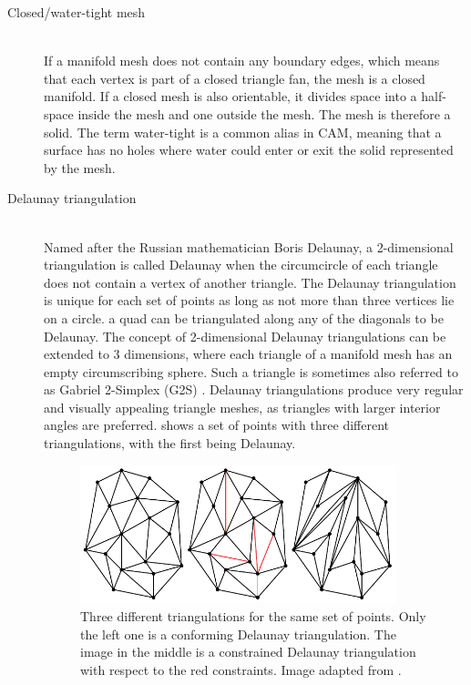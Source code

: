 \begin{description}
	\item[Closed/water-tight mesh] \hfill \\
	If a manifold mesh does not contain any boundary edges, which means that each vertex is part of a closed triangle fan, the mesh is a closed manifold.
	If a closed mesh is also orientable, it divides space into a half-space inside the mesh and one outside the mesh.
	The mesh is therefore a solid.
	The term water-tight is a common alias in CAM, meaning that a surface has no holes where water could enter or exit the solid represented by the mesh.




	\item[Delaunay triangulation] \hfill \\
	Named after the Russian mathematician Boris Delaunay, a 2-dimensional triangulation is called Delaunay when the circumcircle of each triangle does not contain a vertex of another triangle.
	The Delaunay triangulation is unique for each set of points as long as not more than three vertices lie on a circle.
	\Eg a quad can be triangulated along any of the diagonals to be Delaunay.
	The concept of 2-dimensional Delaunay triangulations can be extended to 3 dimensions, where each triangle of a manifold mesh has an empty circumscribing sphere.
	Such a triangle is sometimes also referred to as Gabriel 2-Simplex (G2S) \cite{g2s}.
	Delaunay triangulations produce very regular and visually appealing triangle meshes, as triangles with larger interior angles are preferred.
	 shows a set of points with three different triangulations, with the first being Delaunay.

	\begin{figure}[H]
		\centering
		\includegraphics[width=0.9\textwidth]{images/delaunay_triangulation}
		\caption{
			Three different triangulations for the same set of points.
			Only the left one is a conforming Delaunay triangulation.
			The image in the middle is a constrained Delaunay triangulation with respect to the red constraints.
			Image adapted from \cite{delaunay_image}.
		}
		\label{fig:delaunay_triangulation}
	\end{figure}



\end{description}
